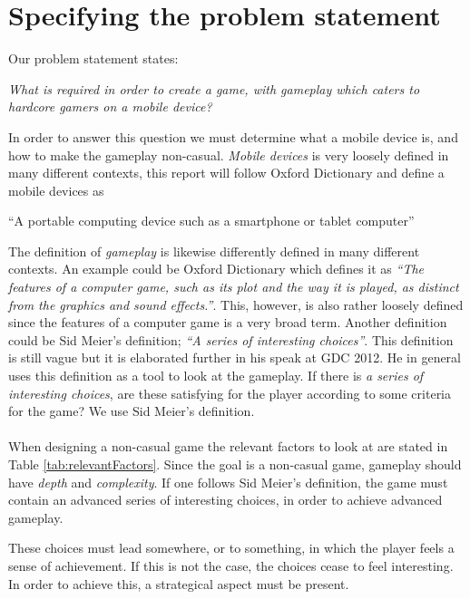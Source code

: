 \section{Specifying the problem statement}
\label{sec:specifyingtheproblemstatemen}
Our problem statement states:

\begin{center}
\textit{What is required in order to create a game, with gameplay which caters to hardcore gamers on a mobile device?}
\end{center}

In order to answer this question we must determine what a mobile device is, and how to make the gameplay non-casual.
\textit{Mobile devices} is very loosely defined in many different contexts, this report will follow Oxford Dictionary and define a mobile devices as 
\begin{center}
``A portable computing device such as a smartphone or tablet computer''\cite{mobileOx}
\end{center}

The definition of \textit{gameplay} is likewise differently defined in many different contexts. 
An example could be Oxford Dictionary which defines it as \textit{``The features of a computer game, such as its plot and the way it is played, as distinct from the graphics and sound effects.''}\cite{gameplayOx}. This, however, is also rather loosely defined since the features of a computer game is a very broad term. 
Another definition could be Sid Meier's definition; \textit{``A series of interesting choices''}\cite{GDC2012}. 
This definition is still vague but it is elaborated further in his speak at GDC 2012.\cite{GDC2012}
He in general uses this definition as a tool to look at the gameplay. If there is \textit{a series of interesting choices}, are these satisfying for the player according to some criteria for the game? We use Sid Meier's definition.\\\\

When designing a non-casual game the relevant factors to look at are stated in Table \ref{tab:relevantFactors}.
Since the goal is a non-casual game, gameplay should have \textit{depth} and \textit{complexity}.
If one follows Sid Meier's definition, the game must contain an advanced series of interesting choices, in order to achieve advanced gameplay.

These choices must lead somewhere, or to something, in which the player feels a sense of achievement. If this is not the case, the choices cease to feel interesting. In order to achieve this, a strategical aspect must be present.

